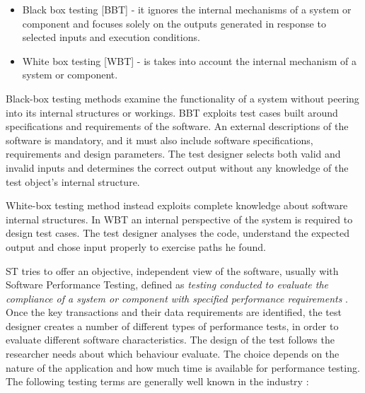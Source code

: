 \begin{itemize}
\item Black box testing [BBT] - it ignores the internal mechanisms of a system or component and focuses solely on the outputs
generated in response to selected inputs and execution conditions.
\item White box testing [WBT] - is takes into account the internal mechanism of a system or component. 
\end{itemize} 

Black-box testing  methods  examine the functionality of a system without peering into its internal structures or workings. BBT exploits test cases built around specifications and requirements of the software. An external descriptions of the software is mandatory, and it must also include software specifications, requirements and design parameters.  The test designer selects both valid and invalid inputs and determines the correct output without any knowledge of the test object's internal structure.

White-box testing  method instead exploits complete knowledge about software internal structures. In WBT an internal perspective of the system is required to design test cases. The test designer analyses the code, understand the expected output and chose input properly  to exercise paths he found. 

ST tries to offer an objective, independent view of the software, usually with Software Performance Testing, defined as  \textit{testing conducted to evaluate the compliance of a system or component with specified performance requirements} \cite{IEEEStd610.12-1990:glossary}. Once  the key transactions and their data requirements are identified, the test designer creates a number of different types of performance tests, in order to evaluate different software characteristics. The design of the test follows the researcher needs about which behaviour evaluate. The choice depends on the nature of the application and how much time is available for performance testing. The following testing terms are generally well known in the industry \cite{Molyneaux:2009:AAP:1550832}:

